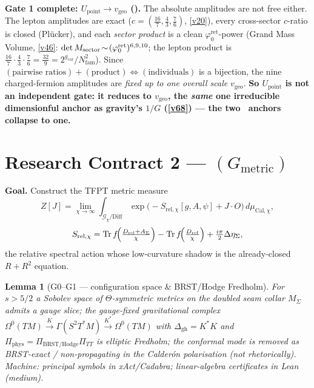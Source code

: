 \documentclass[11pt,a4paper]{article}
\newcommand{\phiz}{\varphi_0^{\mathrm{ret}}}
\newcommand{\Nfam}{N_{\mathrm{fam}}}
\newcommand{\gcar}{g_{\mathrm{car}}}
\newtheorem{lemma}{Lemma}
\begin{document}
\begin{keybox}
\smallskip\noindent\textbf{Gate 1 complete: $U_{\mathrm{point}}\to v_{\mathrm{geo}}$ ().}
The absolute amplitudes are not free either. The lepton amplitudes are exact ($c=(\tfrac{16}7,\tfrac43,\tfrac76)$,
\vref{v20}), every cross-sector $c$-ratio is closed (Pl\"ucker), and each \emph{sector product} is a clean
$\phiz$-power (Grand Mass Volume, \vref{v46}: $\det M_{\rm sector}\!\sim\!(\phiz)^{6,9,10}$; the lepton product is
$\tfrac{16}7\!\cdot\!\tfrac43\!\cdot\!\tfrac76=\tfrac{32}9=2^{\gcar}/\Nfam^2$). Since $(\text{pairwise
ratios})+(\text{product})\Leftrightarrow(\text{individuals})$ is a bijection, the nine charged-fermion
amplitudes are \emph{fixed up to one overall scale} $v_{\mathrm{geo}}$. \textbf{So $U_{\mathrm{point}}$ is not an
independent gate: it reduces to $v_{\mathrm{geo}}$, the \emph{same} one irreducible dimensionful anchor as
gravity's $1/G$ (\vref{v68}) --- the two \mO\ anchors collapse to one.}
\end{keybox}

\section*{Research Contract 2 --- $(G_{\mathrm{metric}})$}
\noindent\textbf{Goal.} Construct the TFPT metric measure
\[
  Z[J]=\lim_{\chi\to\infty}\int_{\mathcal G_\chi/\mathrm{Diff}}
  \exp\!\bigl(-S_{\mathrm{rel},\chi}[g,A,\psi]+J\!\cdot\!O\bigr)\,d\mu_{\mathrm{Cal},\chi},
\]
\[
  S_{\mathrm{rel},\chi}=\operatorname{Tr}f\!\Bigl(\tfrac{D_{\mathrm{rel}}+A_\Sigma}{\chi}\Bigr)
  -\operatorname{Tr}f\!\Bigl(\tfrac{D_{\mathrm{ref}}}{\chi}\Bigr)+\tfrac{i\pi}{2}\Delta\eta_\Sigma,
\]
the relative spectral action whose low-curvature shadow is the already-closed $R+R^2$ equation.

\begin{lemma}[G0--G1 --- configuration space \& BRST/Hodge Fredholm]
For $s>5/2$ a Sobolev space of $\Theta$-symmetric metrics on the doubled seam collar $M_\Sigma$ admits a
gauge slice; the gauge-fixed gravitational complex
$\Omega^0(TM)\xrightarrow{K}\Gamma(S^2T^*M)\xrightarrow{K^*}\Omega^0(TM)$ with
$\Delta_{\mathrm{gh}}=K^*K$ and $\Pi_{\mathrm{phys}}=\Pi_{\mathrm{BRST/Hodge}}\Pi_{TT}$ is elliptic
Fredholm; the conformal mode is removed as BRST-exact / non-propagating in the Calderón polarisation
(\emph{not} rhetorically). \emph{Machine: principal symbols in xAct/Cadabra; linear-algebra certificates
in Lean (medium).}
\end{lemma}
\end{document}
